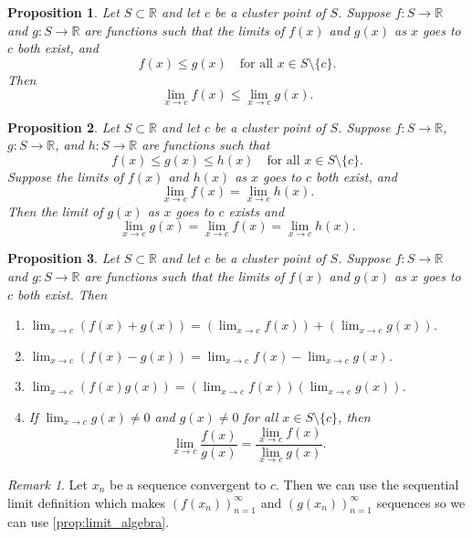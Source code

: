 \documentclass{article}
\newtheorem{proposition}{Proposition}[section]
\theoremstyle{definition}
\theoremstyle{remark}
\newtheorem{remark}{Remark}[section]
\begin{document}
\vspace{.5cm}
\begin{proposition}
Let $S \subset \mathbb{R}$ and let $c$ be a cluster point of $S$. Suppose $f : S \to \mathbb{R}$ and $g : S \to \mathbb{R}$ are functions such that the limits of $f(x)$ and $g(x)$ as $x$ goes to $c$ both exist, and
\[
f(x) \leq g(x) \quad \text{for all } x \in S \setminus \{c\}.
\]
Then
\[
\lim_{x\to c} f(x) \leq \lim_{x\to c} g(x).
\]
\end{proposition}



\vspace{.5cm}
\begin{proposition}
Let $S \subset \mathbb{R}$ and let $c$ be a cluster point of $S$. Suppose $f : S \to \mathbb{R}$, $g : S \to \mathbb{R}$, and $h : S \to \mathbb{R}$ are functions such that
\[
f(x) \leq g(x) \leq h(x) \quad \text{for all } x \in S \setminus \{c\}.
\]
Suppose the limits of $f(x)$ and $h(x)$ as $x$ goes to $c$ both exist, and
\[
\lim_{x\to c} f(x) = \lim_{x\to c} h(x).
\]
Then the limit of $g(x)$ as $x$ goes to $c$ exists and
\[
\lim_{x\to c} g(x) = \lim_{x\to c} f(x) = \lim_{x\to c} h(x).
\]
\end{proposition}


\vspace{.5cm}
\begin{proposition}
Let $S \subset \mathbb{R}$ and let $c$ be a cluster point of $S$. Suppose $f : S \to \mathbb{R}$ and $g : S \to \mathbb{R}$ are functions such that the limits of $f(x)$ and $g(x)$ as $x$ goes to $c$ both exist. Then
\begin{enumerate}
\item $\lim_{x\to c} (f(x) + g(x)) = \left(\lim_{x\to c} f(x)\right) + \left(\lim_{x\to c} g(x)\right)$.
\item $\lim_{x\to c} (f(x) - g(x)) = \lim_{x\to c} f(x) - \lim_{x\to c} g(x)$.
\item $\lim_{x\to c} (f(x)g(x)) = \left(\lim_{x\to c} f(x)\right) \left(\lim_{x\to c} g(x)\right)$.
\item If $\lim_{x\to c} g(x) \neq 0$ and $g(x) \neq 0$ for all $x \in S \setminus \{c\}$, then
\[
\lim_{x\to c} \frac{f(x)}{g(x)} = \frac{\lim_{x\to c} f(x)}{\lim_{x\to c} g(x)}.
\]
\end{enumerate}
\end{proposition}
\begin{remark}
Let $x_n$ be a sequence convergent to $c$. Then we can use the sequential limit definition 
which makes $(f(x_n))^\infty_{n=1}$ and $(g(x_n))^\infty_{n=1}$ sequences so we can use \ref{prop:limit_algebra}.
\end{remark}
\end{document}
